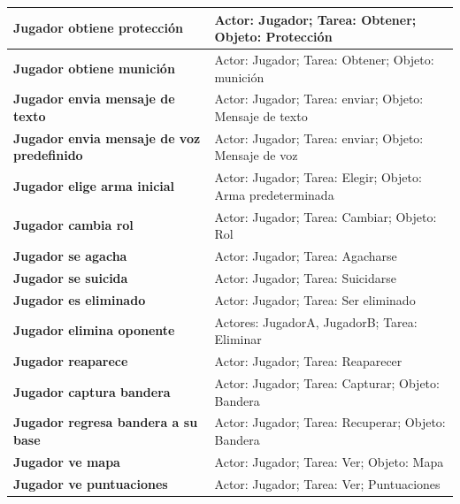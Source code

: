 \begin{center}
\begin{longtable}{|p{5cm}|p{7cm}|}
\textbf{Jugador obtiene protecci\'on} & Actor: Jugador; Tarea: Obtener; Objeto: Protecci\'on\\\hline

\textbf{Jugador obtiene munici\'on} & Actor: Jugador; Tarea: Obtener; Objeto: munici\'on\\\hline

\textbf{Jugador envia mensaje de texto} & Actor: Jugador; Tarea: enviar; Objeto: Mensaje de texto\\\hline

\textbf{Jugador envia mensaje de voz predefinido} & Actor: Jugador; Tarea: enviar; Objeto: Mensaje de voz\\\hline

\textbf{Jugador elige arma inicial} & Actor: Jugador; Tarea: Elegir; Objeto: Arma predeterminada\\\hline

\textbf{Jugador cambia rol} & Actor: Jugador; Tarea: Cambiar; Objeto: Rol\\\hline

\textbf{Jugador se agacha} & Actor: Jugador; Tarea: Agacharse\\\hline

\textbf{Jugador se suicida} & Actor: Jugador; Tarea: Suicidarse\\\hline

\textbf{Jugador es eliminado} & Actor: Jugador; Tarea: Ser eliminado\\\hline

\textbf{Jugador elimina oponente} & Actores: JugadorA, JugadorB; Tarea: Eliminar\\\hline

\textbf{Jugador reaparece} & Actor: Jugador; Tarea: Reaparecer\\\hline

\textbf{Jugador captura bandera} & Actor: Jugador; Tarea: Capturar; Objeto: Bandera\\\hline

\textbf{Jugador regresa bandera a su base} & Actor: Jugador; Tarea: Recuperar; Objeto: Bandera \\\hline

\textbf{Jugador ve mapa} & Actor: Jugador; Tarea: Ver; Objeto: Mapa\\\hline

\textbf{Jugador ve puntuaciones} & Actor: Jugador; Tarea: Ver; Puntuaciones\\\hline

\end{longtable}
\end{center}

